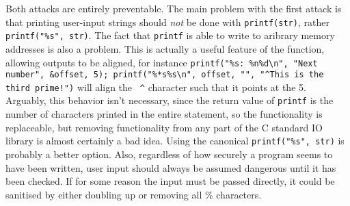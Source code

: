 Both attacks are entirely preventable. The main problem with the first attack is that printing user-input strings should
\emph{not} be done with {\tt printf(str)}, rather {\tt printf("\%s", str)}. The fact that {\tt printf} is able to write
to aribrary memory addresses is also a problem. This is actually a useful feature of the function, allowing outputs to
be aligned, for instance {\tt printf("\%s: \%n\%d\textbackslash n", "Next number", \&offset, 5);
printf("\%*s\%s\textbackslash n", offset, "", "\textasciicircum This is the third prime!")} will align the {\tt
\textasciicircum} character such that it points at the 5. Arguably, this behavior isn't necessary, since the return
value of {\tt printf} is the number of characters printed in the entire statement, so the functionality is replaceable,
but removing functionality from any part of the C standard IO library is almost certainly a bad idea. Using the
canonical {\tt printf("\%s", str)} is probably a better option. Also, regardless of how securely a program seems to have
been written, user input should always be assumed dangerous until it has been checked. If for some reason the input must
be passed directly, it could be sanitised by either doubling up or removing all \% characters.
